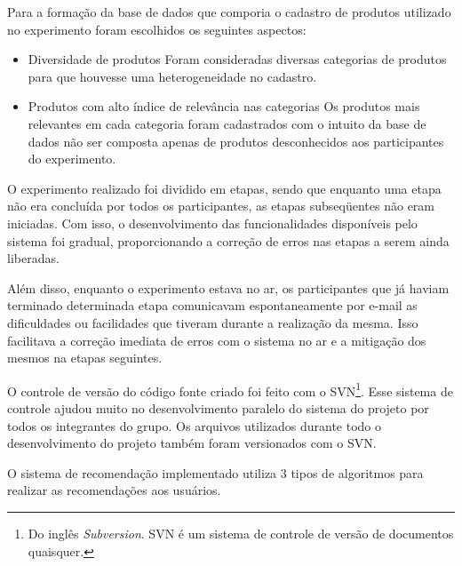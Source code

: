  Para a formação da base de dados que comporia o cadastro de produtos utilizado no experimento foram escolhidos os seguintes aspectos:

\begin{itemize}
	\item Diversidade de produtos
	\subitem Foram consideradas diversas categorias de produtos para que houvesse uma heterogeneidade no cadastro.
	\item Produtos com alto índice de relevância nas categorias
	\subitem Os produtos mais relevantes em cada categoria foram cadastrados com o intuito da base de dados não ser composta apenas de produtos desconhecidos aos participantes do experimento.
\end{itemize}

 O experimento realizado foi dividido em etapas, sendo que enquanto uma etapa não era concluída por todos os participantes, as etapas subseqüentes não eram iniciadas. Com isso, o desenvolvimento das funcionalidades disponíveis pelo sistema foi gradual, proporcionando a correção de erros nas etapas a serem ainda liberadas.

 Além disso, enquanto o experimento estava no ar, os participantes que já haviam terminado determinada etapa comunicavam espontaneamente por e-mail as dificuldades ou facilidades que tiveram durante a realização da mesma. Isso facilitava a correção imediata de erros com o sistema no ar e a mitigação dos mesmos na etapas seguintes.

 O controle de versão do código fonte criado foi feito com o SVN\footnote{Do inglês \textit{Subversion}. SVN é um sistema de controle de versão de documentos quaisquer.}. Esse sistema de controle ajudou muito no desenvolvimento paralelo do sistema do projeto por todos os integrantes do grupo. Os arquivos utilizados durante todo o desenvolvimento do projeto também foram versionados com o SVN.

 O sistema de recomendação implementado utiliza 3 tipos de algoritmos para realizar as recomendações aos usuários.

